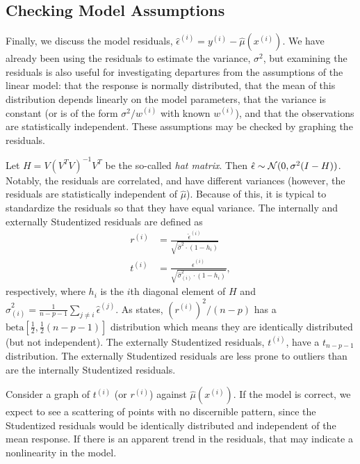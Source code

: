 \documentclass[12pt]{article}
\begin{document}
\subsection{Checking Model Assumptions}
Finally, we discuss the model residuals, $\hat{\epsilon}^{(i)} = y^{(i)} - \hat{\mu}(x^{(i)})$. We have already been using the residuals to estimate the variance, $\sigma^2$, but examining the residuals is also useful for investigating departures from the assumptions of the linear model: that the response is normally distributed, that the mean of this distribution depends linearly on the model parameters, that the variance is constant (or is of the form $\sigma^2/w^{(i)}$ with known $w^{(i)}$), and that the observations are statistically independent. These assumptions may be checked by graphing the residuals.

Let $H = V (V^T V)^{-1} V^T$ be the so-called \textit{hat matrix}. Then $\hat{\epsilon} \sim {\mathcal N}(0, \sigma^2 (I - H))$. Notably, the residuals are correlated, and have different variances (however, the residuals are statistically independent of $\hat{\mu}$). Because of this, it is typical to standardize the residuals so that they have equal variance. The internally and externally Studentized residuals are defined as
\begin{align*}
   r^{(i)} &= \frac{\hat{\epsilon}^{(i)}}{\sqrt{\hat{\sigma}^2 \cdot (1 - h_i)}} \\
   t^{(i)} &= \frac{\hat{\epsilon}^{(i)}}{\sqrt{\hat{\sigma}_{(i)}^2 \cdot (1 - h_i)}},
\end{align*}
respectively, where $h_i$ is the $i$th diagonal element of $H$ and $\hat{\sigma}_{(i)}^2 = \frac{1}{n-p-1} \sum_{j \neq i} \hat{\epsilon}^{(j)}$. As \cite[\S~10.2]{Seber:2003} states, $(r^{(i)})^2/(n-p)$ has a $\textrm{beta}[\frac{1}{2}, \frac{1}{2}(n-p-1)]$ distribution which means they are identically distributed (but not independent). The externally Studentized residuals, $t^{(i)}$, have a $t_{n-p-1}$ distribution. The externally Studentized residuals are less prone to outliers than are the internally Studentized residuals.

Consider a graph of $t^{(i)}$ (or $r^{(i)}$) against $\hat{\mu}(x^{(i)})$. If the model is correct, we expect to see a scattering of points with no discernible pattern, since the Studentized residuals would be identically distributed and independent of the mean response. If there is an apparent trend in the residuals, that may indicate a nonlinearity in the model.
\end{document}

